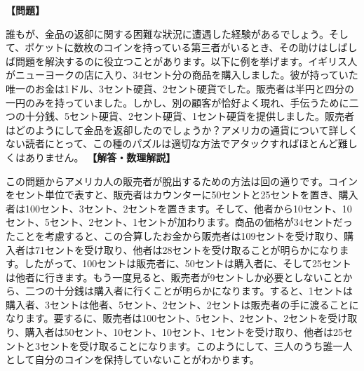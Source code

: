 \documentclass[10pt,a4paper,oneside,openany]{ltjsbook}
\begin{document}
\begin{tcolorbox}[colback=softblue,colframe=primaryblue,title=\textbf{第 27 問：差し入れて金を返す （原題: GIVING CHANGE.）},arc=2mm,boxrule=1pt,breakable]
\textbf{【問題】}\par\vspace{0.3em}
誰もが、金品の返卻に関する困難な狀況に遭遇した経験があるでしょう。そして、ポケットに数枚のコインを持っている第三者がいるとき、その助けはしばしば問題を解決するのに役立つことがあります。以下に例を挙げます。イギリス人がニューヨークの店に入り、34セント分の商品を購入しました。彼が持っていた唯一のお金は1ドル、3セント硬貨、2セント硬貨でした。販売者は半円と四分の一円のみを持っていました。しかし、別の顧客が恰好よく現れ、手伝うために二つの十分銭、5セント硬貨、2セント硬貨、1セント硬貨を提供しました。販売者はどのようにして金品を返卻したのでしょうか？アメリカの通貨について詳しくない読者にとって、この種のパズルは適切な方法でアタックすればほとんど難しくはありません。
\tcblower
\textbf{【解答・数理解説】}\par\vspace{0.3em}
この問題からアメリカ人の販売者が脫出するための方法は回の通りです。コインをセント単位で表すと、販売者はカウンターに50セントと25セントを置き、購入者は100セント、3セント、2セントを置きます。そして、他者から10セント、10セント、5セント、2セント、1セントが加わります。商品の価格が34セントだったことを考慮すると、この合算したお金から販売者は109セントを受け取り、購入者は71セントを受け取り、他者は28セントを受け取ることが明らかになります。したがって、100セントは販売者に、50セントは購入者に、そして25セントは他者に行きます。もう一度見ると、販売者が9セントしか必要としないことから、二つの十分銭は購入者に行くことが明らかになります。すると、1セントは購入者、3セントは他者、5セント、2セント、2セントは販売者の手に渡ることになります。要するに、販売者は100セント、5セント、2セント、2セントを受け取り、購入者は50セント、10セント、10セント、1セントを受け取り、他者は25セントと3セントを受け取ることになります。このようにして、三人のうち誰一人として自分のコインを保持していないことがわかります。
\end{tcolorbox}
\end{document}
